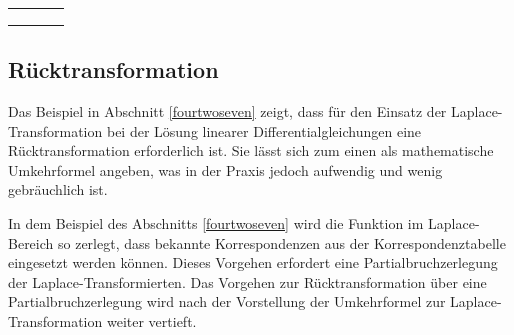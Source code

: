 \begin{table}[H]
{\begin{tabular}{| c | c | c | c |}
\parbox[c][0.6in][c]{0.3in}{} &
\parbox[c][0.6in][c]{2.4in}{} & 
\parbox[c][0.6in][c]{1.2in}{} & 
\parbox[c][0.6in][c]{2.4in}{}\\
\hline

\parbox[c][0.5in][c]{0.3in}{} &
\parbox[c][0.5in][c]{2.4in}{} & 
\parbox[c][0.5in][c]{1.2in}{} & 
\parbox[c][0.5in][c]{2.4in}{}\\
\hline

\parbox[c][0.5in][c]{0.3in}{} &
\parbox[c][0.5in][c]{2.4in}{} & 
\parbox[c][0.5in][c]{1.2in}{} & 
\parbox[c][0.5in][c]{2.4in}{}\\
\hline

\parbox[c][0.5in][c]{0.3in}{} &
\parbox[c][0.5in][c]{2.4in}{} & 
\parbox[c][0.5in][c]{1.2in}{} & 
\parbox[c][0.5in][c]{2.4in}{}\\
\hline

\end{tabular}%
}
\label{tab:fourfour}
\end{table}

\clearpage

\subsection{Rücktransformation}

\noindent Das Beispiel in Abschnitt \ref{fourtwoseven} zeigt, dass für den Einsatz der Laplace-Transformation bei der Lösung linearer Differentialgleichungen eine Rücktransformation erforderlich ist. Sie lässt sich zum einen als mathematische Umkehrformel angeben, was in der Praxis jedoch aufwendig und wenig gebräuchlich
ist.\medskip

\noindent In dem Beispiel des Abschnitts \ref{fourtwoseven} wird die Funktion im Laplace-Bereich so zerlegt, dass bekannte Korrespondenzen aus der Korrespondenztabelle eingesetzt werden können. Dieses Vorgehen erfordert eine Partialbruchzerlegung der Laplace-Transformierten. Das Vorgehen zur Rücktransformation über eine Partialbruchzerlegung wird nach der Vorstellung der Umkehrformel zur Laplace-Transformation weiter vertieft.

